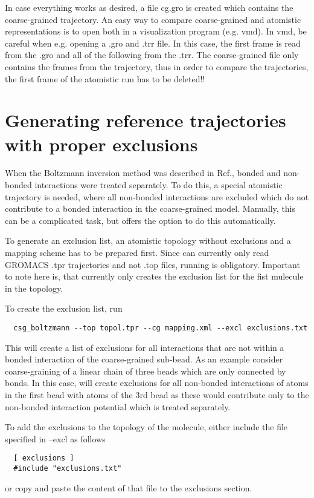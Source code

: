 In case everything works as desired, a file cg.gro is created which contains the coarse-grained trajectory. An easy way to compare coarse-grained and atomistic representations is to open both in a visualization program (e.g. vmd).  In vmd, be careful when e.g. opening a .gro and .trr file. In this case, the first frame is read from the .gro and all of the following from the .trr. The coarse-grained file only contains the frames from the trajectory, thus in order to compare the trajectories, the first frame of the atomistic run has to be deleted!!

\section{Generating reference trajectories with proper exclusions}
When the Boltzmann inversion method was described in Ref.\cite{Tschoep:1998}, bonded and non-bonded interactions were treated separately. To do this, a special atomistic trajectory is needed, where all non-bonded interactions are excluded which do not contribute to a bonded interaction in the coarse-grained model. Manually, this can be a complicated task, but  offers the option  to do this automatically.

To generate an exclusion list, an atomistic topology without exclusions and a mapping scheme has to be prepared first. Since \votca can currently only read GROMACS .tpr trajectories and not .top files, running  is obligatory. Important to note here is, that  currently only creates the exclusion list for the fist mulecule in the topology.

To create the exclusion list, run
\begin{verbatim}
  csg_boltzmann --top topol.tpr --cg mapping.xml --excl exclusions.txt
\end{verbatim}
This will create a list of exclusions for all interactions that are not within a bonded interaction of the coarse-grained sub-bead. As an example consider coarse-graining of a linear chain of three beads  which are only connected by bonds. In this case,  will create exclusions for all non-bonded interactions of atoms in the first bead with atoms of the 3rd bead as these would contribute only to the non-bonded interaction potential which is treated separately.

To add the exclusions to the \gromacs topology of the molecule, either include the file specified in --excl as follows
\begin{verbatim}
  [ exclusions ]
  #include "exclusions.txt"
\end{verbatim}
or copy and paste the content of that file to the exclusions section.


